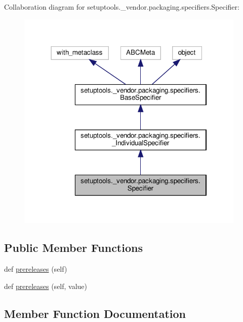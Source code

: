 Collaboration diagram for setuptools.\+\_\+vendor.\+packaging.\+specifiers.\+Specifier\+:
\nopagebreak
\begin{figure}[H]
\begin{center}
\leavevmode
\includegraphics[width=310pt]{classsetuptools_1_1__vendor_1_1packaging_1_1specifiers_1_1Specifier__coll__graph}
\end{center}
\end{figure}
\subsection*{Public Member Functions}
\begin{DoxyCompactItemize}
\item 
def \hyperlink{classsetuptools_1_1__vendor_1_1packaging_1_1specifiers_1_1Specifier_a2aba0f7db7ea169989e656cfead54e9b}{prereleases} (self)
\item 
def \hyperlink{classsetuptools_1_1__vendor_1_1packaging_1_1specifiers_1_1Specifier_a6ba68d7e24800548e4ce987f0b05e174}{prereleases} (self, value)
\end{DoxyCompactItemize}


\subsection{Member Function Documentation}
\mbox{\label{classsetuptools_1_1__vendor_1_1packaging_1_1specifiers_1_1Specifier_a2aba0f7db7ea169989e656cfead54e9b}} 
